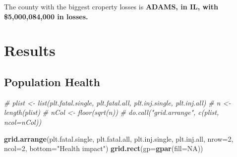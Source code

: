 \documentclass[]{article}
\newenvironment{Shaded}{\begin{snugshade}}{\end{snugshade}}
\newcommand{\KeywordTok}[1]{\textcolor[rgb]{0.13,0.29,0.53}{\textbf{{#1}}}}
\newcommand{\DataTypeTok}[1]{\textcolor[rgb]{0.13,0.29,0.53}{{#1}}}
\newcommand{\DecValTok}[1]{\textcolor[rgb]{0.00,0.00,0.81}{{#1}}}
\newcommand{\StringTok}[1]{\textcolor[rgb]{0.31,0.60,0.02}{{#1}}}
\newcommand{\CommentTok}[1]{\textcolor[rgb]{0.56,0.35,0.01}{\textit{{#1}}}}
\newcommand{\OtherTok}[1]{\textcolor[rgb]{0.56,0.35,0.01}{{#1}}}
\newcommand{\NormalTok}[1]{{#1}}
\begin{document}
\begin{Shaded}
\end{Shaded}

The county with the biggest croperty losses is \textbf{ADAMS, in IL,
with \$5,000,084,000 in losses.}

\section{Results}\label{results}

\subsection{Population Health}\label{population-health}

\begin{Shaded}
\begin{Highlighting}[]
\CommentTok{# plist <- list(plt.fatal.single, plt.fatal.all, plt.inj.single, plt.inj.all)}
\CommentTok{# n <- length(plist)}
\CommentTok{# nCol <- floor(sqrt(n))}
\CommentTok{# do.call("grid.arrange", c(plist, ncol=nCol))}

\KeywordTok{grid.arrange}\NormalTok{(plt.fatal.single, plt.fatal.all, plt.inj.single, plt.inj.all, }
             \DataTypeTok{nrow=}\DecValTok{2}\NormalTok{, }\DataTypeTok{ncol=}\DecValTok{2}\NormalTok{,}
             \DataTypeTok{bottom=}\StringTok{"Health impact"}\NormalTok{)}
\KeywordTok{grid.rect}\NormalTok{(}\DataTypeTok{gp=}\KeywordTok{gpar}\NormalTok{(}\DataTypeTok{fill=}\OtherTok{NA}\NormalTok{))}
\end{Highlighting}
\end{Shaded}
\end{document}
